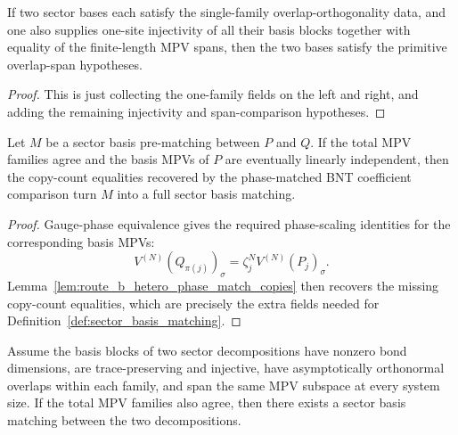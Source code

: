 \begin{lemma}%
\label{lem:sector_basis_overlap_ortho_to_span}
	\leanok
	If two sector bases each satisfy the single-family overlap-orthogonality data,
	and one also supplies one-site injectivity of all their basis blocks together
	with equality of the finite-length MPV spans, then the two bases satisfy the
	primitive overlap-span hypotheses.
\end{lemma}

\begin{proof}
	\leanok
	This is just collecting the one-family fields on the left and right, and adding
	the remaining injectivity and span-comparison hypotheses.
\end{proof}

\begin{lemma}%
\label{lem:sector_basis_pre_matching_to_matching}
	\leanok
	Let $M$ be a sector basis pre-matching between $P$ and $Q$. If the total
	MPV families agree and the basis MPVs of $P$ are eventually linearly
	independent, then the copy-count equalities recovered by the phase-matched
	BNT coefficient comparison turn $M$ into a full sector basis matching.
\end{lemma}

\begin{proof}
	\leanok
	Gauge-phase equivalence gives the required phase-scaling identities for
	the corresponding basis MPVs:
	\[
		V^{(N)}(Q_{\pi(j)})_\sigma
		=
		\zeta_j^N V^{(N)}(P_j)_\sigma.
	\]
	Lemma~\ref{lem:route_b_hetero_phase_match_copies} then recovers the
	missing copy-count equalities, which are precisely the extra fields needed
	for Definition~\ref{def:sector_basis_matching}.
\end{proof}

\begin{theorem}%
\label{thm:sector_basis_matching_from_overlap_ortho_span}
	\leanok
	Assume the basis blocks of two sector decompositions have nonzero bond
	dimensions, are trace-preserving and injective, have asymptotically
	orthonormal overlaps within each family, and span the same MPV subspace at
	every system size. If the total MPV families also agree, then there exists a
	sector basis matching between the two decompositions.
\end{theorem}

